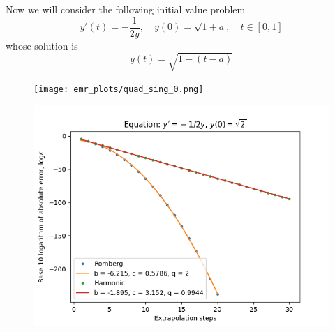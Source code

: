 Now we will consider the following initial value problem
\begin{equation}
y'(t) = -\frac{1}{2y}, \quad y(0) = \sqrt{1+a},\quad t\in [0,1]\label{47}
\end{equation}
whose solution is 
\[
y(t) = \sqrt{1 - (t-a)}
\]
\begin{figure}[H]
\centering
\begin{minipage}{0.45\textwidth}
\centering
\texttt{[image: emr\_plots/quad\_sing\_0.png]}
\end{minipage}
\begin{minipage}{0.45\textwidth}
\centering
\includegraphics[scale=0.45]{emr_plots/quad_sing_0_hp_steps.png}
\end{minipage}
\end{figure}

